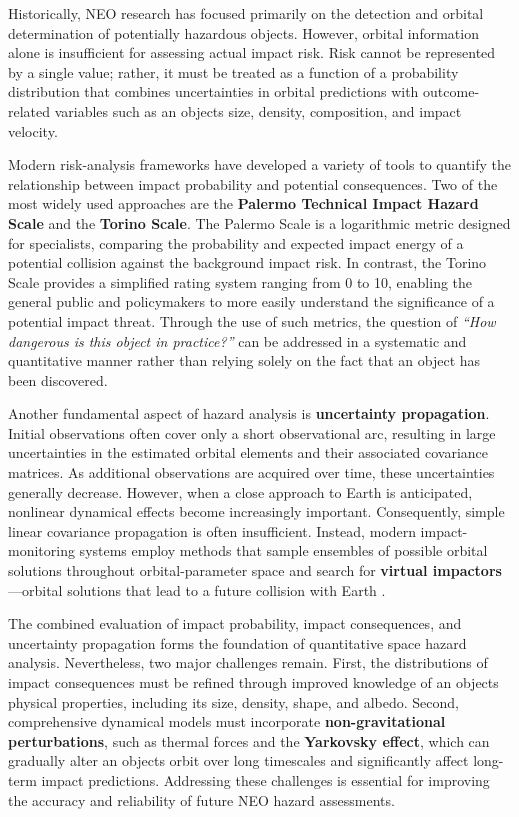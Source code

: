Historically, NEO research has focused primarily on the detection and orbital determination of potentially hazardous objects. However, orbital information alone is insufficient for assessing actual impact risk. Risk cannot be represented by a single value; rather, it must be treated as a function of a probability distribution that combines uncertainties in orbital predictions with outcome-related variables such as an object\textquotesingle s size, density, composition, and impact velocity.

Modern risk-analysis frameworks have developed a variety of tools to quantify the relationship between impact probability and potential consequences. Two of the most widely used approaches are the \textbf{Palermo Technical Impact Hazard Scale} and the \textbf{Torino Scale}. The Palermo Scale is a logarithmic metric designed for specialists, comparing the probability and expected impact energy of a potential collision against the background impact risk. In contrast, the Torino Scale provides a simplified rating system ranging from 0 to 10, enabling the general public and policymakers to more easily understand the significance of a potential impact threat. Through the use of such metrics, the question of \emph{``How dangerous is this object in practice?''} can be addressed in a systematic and quantitative manner rather than relying solely on the fact that an object has been discovered.

Another fundamental aspect of hazard analysis is \textbf{uncertainty propagation}. Initial observations often cover only a short observational arc, resulting in large uncertainties in the estimated orbital elements and their associated covariance matrices. As additional observations are acquired over time, these uncertainties generally decrease. However, when a close approach to Earth is anticipated, nonlinear dynamical effects become increasingly important. Consequently, simple linear covariance propagation is often insufficient. Instead, modern impact-monitoring systems employ methods that sample ensembles of possible orbital solutions throughout orbital-parameter space and search for \textbf{virtual impactors}---orbital solutions that lead to a future collision with Earth \cite{milani2005}.

The combined evaluation of impact probability, impact consequences, and uncertainty propagation forms the foundation of quantitative space hazard analysis. Nevertheless, two major challenges remain. First, the distributions of impact consequences must be refined through improved knowledge of an object\textquotesingle s physical properties, including its size, density, shape, and albedo. Second, comprehensive dynamical models must incorporate \textbf{non-gravitational perturbations}, such as thermal forces and the \textbf{Yarkovsky effect}, which can gradually alter an object\textquotesingle s orbit over long timescales and significantly affect long-term impact predictions. Addressing these challenges is essential for improving the accuracy and reliability of future NEO hazard assessments.

